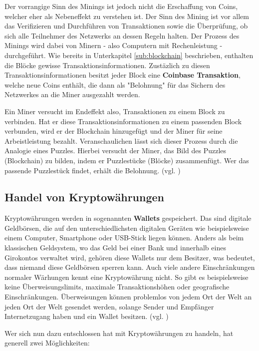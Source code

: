 \documentclass[oneside]{ausarbeitung}
\begin{document}
Der vorrangige Sinn des Minings ist jedoch nicht die Erschaffung von
Coins, welcher eher als Nebeneffekt zu verstehen ist. Der Sinn des
Mining ist vor allem das Verifizieren und Durchführen von
Transaktionen sowie die Überprüfung, ob sich alle Teilnehmer des
Netzwerks an dessen Regeln halten. Der Prozess des Minings wird dabei
von Minern - also Computern mit Rechenleistung - durchgeführt. Wie
bereits in Unterkapitel \ref{sub:blockchain} beschrieben, enthalten
die Blöcke gewisse Transaktionsinformationen. Zustäzlich zu diesen
Transaktionsinformationen besitzt jeder Block eine \textbf{Coinbase
Transaktion}, welche neue Coins enthält, die dann als "Belohnung"
für das Sichern des Netzwerkes an die Miner ausgezahlt werden.  

Ein Miner versucht im Endeffekt also, Transaktionen zu einem Block zu
verbinden. Hat er diese Transaktionsinformationen zu einem passenden
Block verbunden, wird er der Blockchain hinzugefügt und der Miner
für seine Arbeistleistung bezahlt. Veranschaulichen lässt sich
dieser Prozess durch die Analogie eines Puzzles.  Hierbei versucht der
Miner, das Bild des Puzzles (Blockchain) zu bilden, indem er
Puzzlestücke (Blöcke) zusammenfügt. Wer das passende Puzzlestück
findet, erhält die Belohnung. (vgl. \cite{mining})


\subsection{Handel von Kryptowährungen}
\label{sub:handel_von_kryptowährungen}

Kryptowährungen werden in sogenannten \textbf{Wallets} gespeichert.
Das sind digitale Geldbörsen, die auf den unterschiedlichsten
digitalen Geräten wie beispielsweise einem Computer, Smartphone oder
USB-Stick liegen können. Anders als beim klassischen Geldsystem, wo
das Geld bei einer Bank und innerhalb eines Girokontos verwaltet wird,
gehören diese Wallets nur dem Besitzer, was bedeutet, dass niemand
diese Geldbörsen sperren kann. Auch viele andere Einschränkungen
normaler Wärhungen kennt eine Kryptowährung nicht. So gibt es
beispielsweise keine Überweisungslimits, maximale Transaktionshöhen
oder geografische Einschränkungen. Überweisungen können problemlos
von jedem Ort der Welt an jeden Ort der Welt gesendet werden, solange
Sender und Empfänger Internetzugang haben und ein Wallet besitzen.
(vgl. \cite{bitcoins_erklärung})

Wer sich nun dazu entschlossen hat mit Kryptowährungen zu handeln,
hat generell zwei Möglichkeiten:
\end{document}
